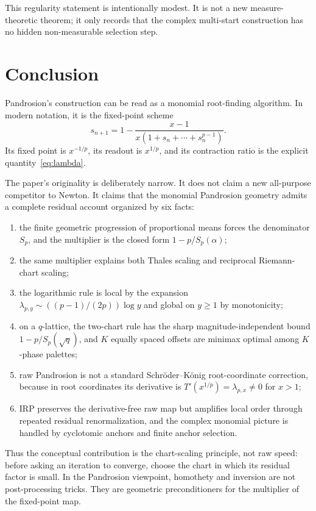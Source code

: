 \documentclass[10pt,a4paper]{article}
\theoremstyle{plain}
\theoremstyle{definition}
\theoremstyle{remark}
\begin{document}
This regularity statement is intentionally modest.  It is not a new
measure-theoretic theorem; it only records that the complex multi-start
construction has no hidden non-measurable selection step.

\section{Conclusion}
\label{sec:conclusion}

Pandrosion's construction can be read as a monomial root-finding algorithm.  In
modern notation, it is the fixed-point scheme
\[
  s_{n+1}=1-\frac{x-1}{x(1+s_n+\cdots+s_n^{p-1})}.
\]
Its fixed point is $x^{-1/p}$, its readout is $x^{1/p}$, and its contraction
ratio is the explicit quantity~\eqref{eq:lambda}.

The paper's originality is deliberately narrow.  It does not claim a new
all-purpose competitor to Newton.  It claims that the monomial Pandrosion
geometry admits a complete residual account organized by six facts:
\begin{enumerate}
  \item the finite geometric progression of proportional means forces the
  denominator $S_p$, and the multiplier is the closed form
  $1-p/S_p(\alpha)$;
  \item the same multiplier explains both Thales scaling and reciprocal
  Riemann-chart scaling;
  \item the logarithmic rule is local by the expansion
  $\lambda_{p,y}\sim ((p-1)/(2p))\log y$ and global on $y\ge1$ by
  monotonicity;
  \item on a $q$-lattice, the two-chart rule has the sharp
  magnitude-independent bound $1-p/S_p(\sqrt q)$, and $K$ equally spaced
  offsets are minimax optimal among $K$-phase palettes;
  \item raw Pandrosion is not a standard Schröder--König root-coordinate
  correction, because in root coordinates its derivative is
  $T'(x^{1/p})=\lambda_{p,x}\ne0$ for $x>1$;
  \item IRP preserves the derivative-free raw map but amplifies local order through repeated residual renormalization, and the complex monomial picture is handled by cyclotomic anchors and finite anchor selection.
\end{enumerate}

Thus the conceptual contribution is the chart-scaling principle, not raw speed:
before asking an iteration to converge, choose the chart in which its residual
factor is small.  In the Pandrosion viewpoint, homothety and inversion are not
post-processing tricks.  They are geometric preconditioners for the multiplier
of the fixed-point map.
\end{document}

